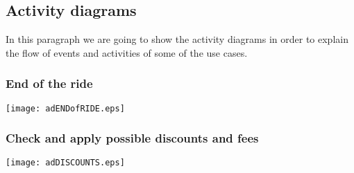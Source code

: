 \pagebreak
\subsection{Activity diagrams}
In this paragraph we are going to show the activity diagrams in order to explain the flow of events and activities of some of the use cases.

\subsubsection{End of the ride}
	\centerline{
		\texttt{[image: adENDofRIDE.eps]}}

\subsubsection{Check and apply possible discounts and fees}
	\centerline{
		\texttt{[image: adDISCOUNTS.eps]}}